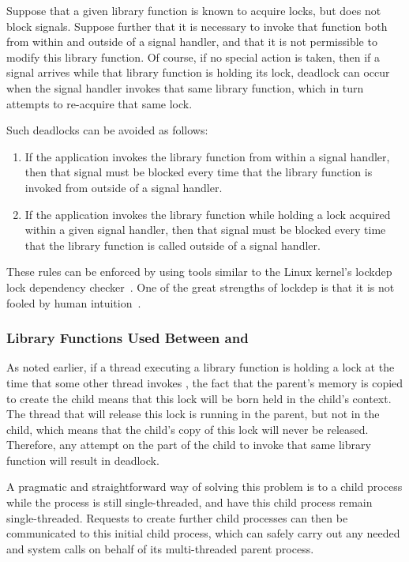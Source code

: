 Suppose that a given library function is known to acquire locks,
but does not block signals.
Suppose further that it is necessary to invoke that function both from
within and outside of a signal handler, and that it is not permissible
to modify this library function.
Of course, if no special action is taken, then if a signal arrives
while that library function is holding its lock, deadlock can occur
when the signal handler invokes that same library function,
which in turn attempts to re-acquire that same lock.

Such deadlocks can be avoided as follows:

\begin{enumerate}
\item	If the application invokes the library function from
	within a signal handler, then that signal must be blocked
	every time that the library function is invoked from outside
	of a signal handler.
\item	If the application invokes the library function
	while holding a lock acquired within a given signal
	handler, then that signal must be blocked every time that the
	library function is called outside of a signal handler.
\end{enumerate}

These rules can be enforced by using tools similar to
the Linux kernel's lockdep lock dependency
checker~\cite{JonathanCorbet2006lockdep}.
One of the great strengths of lockdep is that it is not fooled by
human intuition~\cite{StevenRostedt2011locdepCryptic}.

\subsubsection{Library Functions Used Between  and }
\label{sec:locking:Library Functions Used Between fork() and exec()}

As noted earlier, if a thread executing a library function is holding
a lock at the time that some other thread invokes , the
fact that the parent's memory is copied to create the child means that
this lock will be born held in the child's context.
The thread that will release this lock is running in the parent, but not
in the child, which means that the child's copy of this lock will never
be released.
Therefore, any attempt on the part of the child to invoke that same
library function will result in deadlock.

A pragmatic and straightforward way of solving this problem is
to  a child process while the process is still single-threaded,
and have this child process remain single-threaded.
Requests to create further child processes can then be communicated
to this initial child process, which can safely carry out any
needed  and  system calls on behalf of its
multi-threaded parent process.

